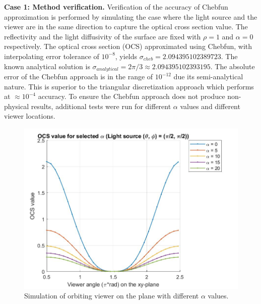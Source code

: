 \documentclass[11pt,reqno]{amsart}
\theoremstyle{definition}
\begin{document}
{\bf Case 1: Method verification.} Verification of the accuracy of Chebfun approximation is performed by simulating the case where the light source and the viewer are in the same direction to capture the optical cross section value. The reflectivity and the light diffusivity of the surface are fixed with $\rho = 1$ and $\alpha =0$ respectively. The optical cross section (OCS) approximated using Chebfun, with interpolating error tolerance of $10^{-8}$, yields $\sigma_{cheb} = 2.094395102389723$. The known analytical solution is $\sigma_{analytical} = 2\pi/3 \approx 2.094395102393195$. The absolute error of the Chebfun approach is in the range of $10^{-12}$ due its semi-analytical nature. This is superior to the triangular discretization approach which performs at $\approx 10^{-4}$ accuracy. To ensure the Chebfun approach does not produce non-physical results, additional tests were run for different $\alpha$ values and different viewer locations.

\begin{figure}[h]
\centering \includegraphics[scale=0.4]{./figs/OCS_parallel_plane}    
\caption{Simulation of orbiting viewer on the plane with different $\alpha$ values.}    
\label{OCSParallelPlane}
\end{figure}
\end{document}
